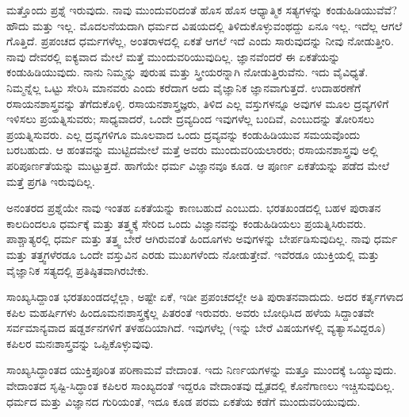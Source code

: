 ಮತ್ತೊಂದು ಪ್ರಶ್ನೆ ಇರುವುದು. ನಾವು ಮುಂದುವರಿದಂತೆ ಹೊಸ ಹೊಸ ಆಧ್ಯಾತ್ಮಿಕ ಸತ್ಯಗಳನ್ನು ಕಂಡುಹಿಡಿಯುವೆವೆ? ಹೌದು ಮತ್ತು ಇಲ್ಲ. ಮೊದಲನೆಯದಾಗಿ ಧರ್ಮದ ವಿಷಯದಲ್ಲಿ ತಿಳಿದುಕೊಳ್ಳುವಂಥದ್ದು ಏನೂ ಇಲ್ಲ. ಇದೆಲ್ಲ ಆಗಲೆ ಗೊತ್ತಿದೆ. ಪ್ರಪಂಚದ ಧರ್ಮಗಳೆಲ್ಲ, ಅಂತರಾಳದಲ್ಲಿ ಏಕತೆ ಆಗಲೆ ಇದೆ ಎಂದು ಸಾರುವುದನ್ನು ನೀವು ನೋಡುತ್ತೀರಿ. ನಾವು ದೇವರಲ್ಲಿ ಐಕ್ಯವಾದ ಮೇಲೆ ಮತ್ತೆ ಮುಂದುವರಿಯುವುದಿಲ್ಲ. ಜ್ಞಾನವೆಂದರೆ ಈ ಏಕತೆಯನ್ನು ಕಂಡುಹಿಡಿಯುವುದು. ನಾನು ನಿಮ್ಮನ್ನು ಪುರುಷ ಮತ್ತು ಸ್ತ್ರೀಯರನ್ನಾಗಿ ನೋಡುತ್ತಿರುವೆನು. ಇದು ವೈವಿಧ್ಯತೆ. ನಿಮ್ಮನ್ನೆಲ್ಲ ಒಟ್ಟು ಸೇರಿಸಿ ಮಾನವರು ಎಂದು ಕರೆದಾಗ ಅದು ವೈಜ್ಞಾನಿಕ ಜ್ಞಾನವಾಗುತ್ತದೆ. ಉದಾಹರಣೆಗೆ ರಸಾಯನಶಾಸ್ತ್ರವನ್ನು ತೆಗೆದುಕೊಳ್ಳಿ. ರಸಾಯನಶಾಸ್ತ್ರಜ್ಞರು, ತಿಳಿದ ಎಲ್ಲ ವಸ್ತುಗಳನ್ನೂ ಅವುಗಳ ಮೂಲ ದ್ರವ್ಯಗಳಿಗೆ ಇಳಿಸಲು ಪ್ರಯತ್ನಿಸುವರು; ಸಾಧ್ಯವಾದರೆ, ಒಂದೇ ದ್ರವ್ಯದಿಂದ ಇವುಗಳೆಲ್ಲ ಬಂದಿವೆ, ಎಂಬುದನ್ನು ತೋರಿಸಲು ಪ್ರಯತ್ನಿಸುವರು. ಎಲ್ಲ ದ್ರವ್ಯಗಳಿಗೂ ಮೂಲವಾದ ಒಂದು ದ್ರವ್ಯವನ್ನು ಕಂಡುಹಿಡಿಯುವ ಸಮಯವೊಂದು ಬರಬಹುದು. ಆ ಹಂತವನ್ನು ಮುಟ್ಟಿದಮೇಲೆ ಮತ್ತೆ ಅವರು ಮುಂದುವರಿಯಲಾರರು; ರಸಾಯನಶಾಸ್ತ್ರವು ಅಲ್ಲಿ ಪರಿಪೂರ್ಣತೆಯನ್ನು ಮುಟ್ಟುತ್ತದೆ. ಹಾಗೆಯೇ ಧರ್ಮ ವಿಜ್ಞಾನವೂ ಕೂಡ. ಆ ಪೂರ್ಣ ಏಕತೆಯನ್ನು ಪಡೆದ ಮೇಲೆ ಮತ್ತೆ ಪ್ರಗತಿ ಇರುವುದಿಲ್ಲ.

ಅನಂತರದ ಪ್ರಶ್ನೆಯೇ ನಾವು ಇಂತಹ ಏಕತೆಯನ್ನು ಕಾಣಬಹುದೆ ಎಂಬುದು. ಭರತಖಂಡದಲ್ಲಿ ಬಹಳ ಪುರಾತನ ಕಾಲದಿಂದಲೂ ಧರ್ಮಕ್ಕೆ ಮತ್ತು ತತ್ತ್ವಕ್ಕೆ ಸೇರಿದ ಒಂದು ವಿಜ್ಞಾನವನ್ನು ಕಂಡುಹಿಡಿಯಲು ಪ್ರಯತ್ನಿಸಿರುವರು. ಪಾಶ್ಚಾತ್ಯರಲ್ಲಿ ಧರ್ಮ ಮತ್ತು ತತ್ತ್ವ ಬೇರೆ ಆಗಿರುವಂತೆ ಹಿಂದೂಗಳು ಅವುಗಳನ್ನು ಬೇರ್ಪಡಿಸುವುದಿಲ್ಲ. ನಾವು ಧರ್ಮ ಮತ್ತು ತತ್ತ್ವಗಳೆರಡೂ ಒಂದೇ ವಸ್ತುವಿನ ಎರಡು ಮುಖಗಳೆಂದು ನೋಡುತ್ತೇವೆ. ಇವೆರಡೂ ಯುಕ್ತಿಯಲ್ಲಿ ಮತ್ತು ವೈಜ್ಞಾನಿಕ ಸತ್ಯದಲ್ಲಿ ಪ್ರತಿಷ್ಠಿತವಾಗಿರಬೇಕು.

ಸಾಂಖ್ಯಸಿದ್ದಾಂತ ಭರತಖಂಡದಲ್ಲೆಲ್ಲಾ, ಅಷ್ಟೇ ಏಕೆ, ಇಡೀ ಪ್ರಪಂಚದಲ್ಲೇ ಅತಿ ಪುರಾತನವಾದುದು. ಅದರ ಕರ್ತೃಗಳಾದ ಕಪಿಲ ಮಹರ್ಷಿಗಳು ಹಿಂದೂ\break ಮನಃಶಾಸ್ತ್ರಕ್ಕೆಲ್ಲ ಪಿತರಂತೆ ಇರುವರು. ಅವರು ಬೋಧಿಸಿದ ಹಳೆಯ ಸಿದ್ದಾಂತವೇ ಸರ್ವಮಾನ್ಯವಾದ ಷಡ್ದರ್ಶನಗಳಿಗೆ ತಳಹದಿಯಾಗಿದೆ. ಇವುಗಳೆಲ್ಲ (ಇನ್ನು ಬೇರೆ ವಿಷಯಗಳಲ್ಲಿ ವ್ಯತ್ಯಾಸವಿದ್ದರೂ) ಕಪಿಲರ ಮನಃಶಾಸ್ತ್ರವನ್ನು ಒಪ್ಪಿಕೊಳ್ಳುವುವು.

ಸಾಂಖ್ಯಸಿದ್ಧಾಂತದ ಯುಕ್ತಿಪೂರಿತ ಪರಿಣಾಮವೆ ವೇದಾಂತ. ಇದು ನಿರ್ಣಯಗಳನ್ನು ಮತ್ತೂ ಮುಂದಕ್ಕೆ ಒಯ್ಯುವುದು. ವೇದಾಂತದ ಸೃಷ್ಟಿ-ಸಿದ್ಧಾಂತ  ಕಪಿಲರ ಸಾಂಖ್ಯದಂತೆ ಇದ್ದರೂ ವೇದಾಂತವು ದ್ವೈತದಲ್ಲಿ ಕೊನೆಗಾಣಲು ಇಚ್ಚಿಸುವುದಿಲ್ಲ. ಧರ್ಮದ ಮತ್ತು ವಿಜ್ಞಾನದ ಗುರಿಯಂತೆ, ಇದೂ ಕೂಡ ಪರಮ ಏಕತೆಯ ಕಡೆಗೆ ಮುಂದುವರಿಯುವುದು.

